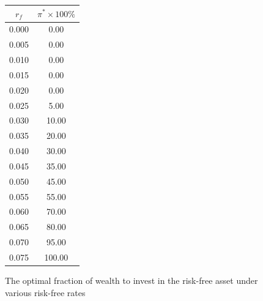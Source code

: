 \documentclass[10pt]{article}
\newenvironment{exercise}[2][Exercise]{\begin{trivlist}
  \item[\hskip \labelsep {\bfseries #1}\hskip \labelsep {\bfseries #2.}]}{\end{trivlist}}
\begin{document}
\begin{exercise}{2}
\begin{enumerate}[(a)]
      \begin{figure}[H]
        \centering
       \begin{tabular}{||c|c||}
\toprule
$r_f$ &        $\pi^* \times 100\%$ \\
\midrule
0.000 &       0.00 \\ \hline
0.005 &       0.00 \\ \hline
0.010 &       0.00 \\ \hline
0.015 &       0.00 \\ \hline
0.020 &       0.00 \\ \hline
0.025 &       5.00 \\ \hline
0.030 &      10.00 \\ \hline
0.035 &      20.00 \\ \hline
0.040 &      30.00 \\ \hline
0.045 &      35.00 \\ \hline
0.050 &      45.00 \\ \hline
0.055 &      55.00 \\ \hline
0.060 &      70.00 \\ \hline
0.065 &      80.00 \\ \hline
0.070 &      95.00 \\ \hline
0.075 &      100.00 \\ \hline
\bottomrule
\end{tabular}
\caption{The optimal fraction of wealth to invest in the risk-free asset under
  various risk-free rates}

 
      \end{figure}

  \end{enumerate}

\newpage

\end{exercise}

	
\end{document}
